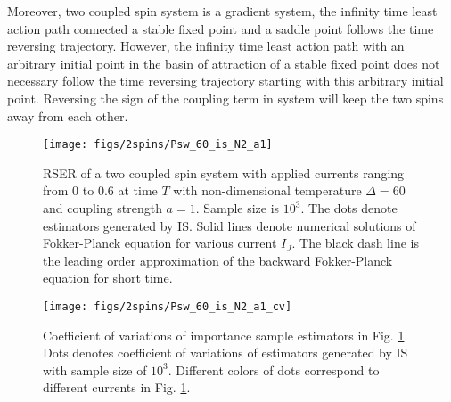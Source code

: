\documentclass[journal,transmag]{IEEEtran}
\begin{document}
Moreover, two coupled spin system is a gradient system, the infinity time least action path connected a stable fixed point and a saddle point follows the time reversing trajectory. However, the infinity time least action path with an arbitrary initial point in the basin of attraction of a stable fixed point does not necessary follow the time reversing trajectory starting with this arbitrary initial point. Reversing the sign of the coupling term in system will keep the two spins away from each other.
\begin{figure}[h]
   \centering
         \texttt{[image: figs/2spins/Psw\_60\_is\_N2\_a1]}
   \caption{RSER of a two coupled spin system with applied currents ranging from $0$ to $0.6$ at time $T$ with non-dimensional temperature $\Delta = 60$ and coupling strength $ a = 1$. Sample size is $10^3$. The dots denote estimators generated by IS. Solid lines denote numerical solutions of Fokker-Planck equation for various current $I_J$. The black dash line is the leading order approximation of the backward Fokker-Planck equation for short time.}
   \label{figs:ISvsMC1_0}
\end{figure}
\begin{figure}[h]
   \centering
         \texttt{[image: figs/2spins/Psw\_60\_is\_N2\_a1\_cv]}
   \caption{Coefficient of variations of importance sample estimators in Fig. \ref{figs:ISvsMC1_0}. Dots denotes coefficient of variations  of estimators generated by IS with sample size of $10^3$. Different colors of dots correspond to different currents in Fig. \ref{figs:ISvsMC1_0}.}
   \label{figs:ISvsMC1_0_cv}
\end{figure}
\end{document}
